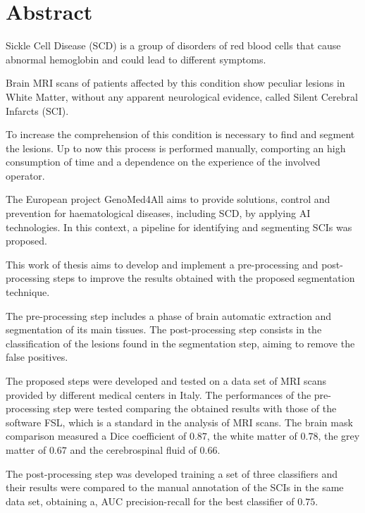 \documentclass{standalone}
\begin{document}
\chapter*{Abstract}

Sickle Cell Disease (SCD) is a group of disorders of red blood cells that cause abnormal hemoglobin and could lead to different symptoms.

Brain MRI scans of patients affected by this condition show peculiar lesions in White Matter, without any apparent neurological evidence, called Silent Cerebral Infarcts (SCI).

To increase the comprehension of this condition is necessary to find and segment the lesions.
Up to now this process is performed manually, comporting an high consumption of time and a dependence on the experience of the involved operator.

The European project GenoMed4All aims to provide solutions, control and prevention for haematological diseases, including SCD, by applying AI technologies. In this context, a pipeline for identifying and segmenting SCIs was proposed. 

This work of thesis aims to develop and implement a pre-processing and post-processing steps to improve the results obtained with the proposed segmentation technique.

The pre-processing step includes a phase of brain automatic extraction and segmentation of its main tissues.
The post-processing step consists in the classification of the lesions found in the segmentation step, aiming to remove the false positives.

The proposed steps were developed and tested on a data set of MRI scans provided by different medical centers in Italy. 
The performances of the pre-processing step were tested comparing the obtained results with those of the software FSL, which is a standard in the analysis of MRI scans.
The brain mask comparison measured a Dice coefficient of $0.87$, the white matter of $0.78$, the grey matter of $0.67$ and the cerebrospinal fluid of $0.66$.

The post-processing step was developed training a set of three classifiers and their results were compared to the manual annotation of the SCIs in the same data set, obtaining a, AUC precision-recall for the best classifier of $0.75$.
\end{document}
